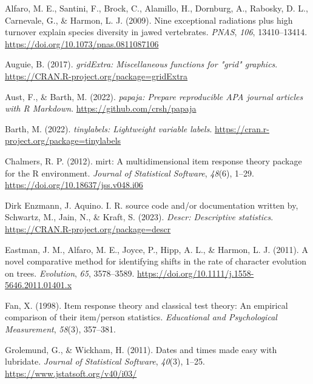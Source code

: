 \documentclass[
  jou]{apa6}
\newlength{\cslhangindent}
\newlength{\cslentryspacingunit} %
\newenvironment{CSLReferences}[2] %
 {%
  \setlength{\parindent}{0pt}
  \ifodd #1
  \let\oldpar\par
  \def\par{\hangindent=\cslhangindent\oldpar}
  \fi
  \setlength{\parskip}{#2\cslentryspacingunit}
 }%
 {}
\begin{document}
\hypertarget{refs}{}
\begin{CSLReferences}{1}{0}
\leavevmode{}%
Alfaro, M. E., Santini, F., Brock, C., Alamillo, H., Dornburg, A., Rabosky, D. L., Carnevale, G., \& Harmon, L. J. (2009). Nine exceptional radiations plus high turnover explain species diversity in jawed vertebrates. \emph{PNAS}, \emph{106}, 13410--13414. \url{https://doi.org/10.1073/pnas.0811087106}

\leavevmode{}%
Auguie, B. (2017). \emph{gridExtra: Miscellaneous functions for "grid" graphics}. \url{https://CRAN.R-project.org/package=gridExtra}

\leavevmode{}%
Aust, F., \& Barth, M. (2022). \emph{{papaja}: {Prepare} reproducible {APA} journal articles with {R Markdown}}. \url{https://github.com/crsh/papaja}

\leavevmode{}%
Barth, M. (2022). \emph{{tinylabels}: Lightweight variable labels}. \url{https://cran.r-project.org/package=tinylabels}

\leavevmode{}%
Chalmers, R. P. (2012). {mirt}: A multidimensional item response theory package for the {R} environment. \emph{Journal of Statistical Software}, \emph{48}(6), 1--29. \url{https://doi.org/10.18637/jss.v048.i06}

\leavevmode{}%
Dirk Enzmann, J. Aquino. I. R. source code and/or documentation written by, Schwartz, M., Jain, N., \& Kraft, S. (2023). \emph{Descr: Descriptive statistics}. \url{https://CRAN.R-project.org/package=descr}

\leavevmode{}%
Eastman, J. M., Alfaro, M. E., Joyce, P., Hipp, A. L., \& Harmon, L. J. (2011). A novel comparative method for identifying shifts in the rate of character evolution on trees. \emph{Evolution}, \emph{65}, 3578--3589. \url{https://doi.org/10.1111/j.1558-5646.2011.01401.x}

\leavevmode{}%
Fan, X. (1998). Item response theory and classical test theory: An empirical comparison of their item/person statistics. \emph{Educational and Psychological Measurement}, \emph{58}(3), 357--381.

\leavevmode{}%
Grolemund, G., \& Wickham, H. (2011). Dates and times made easy with {lubridate}. \emph{Journal of Statistical Software}, \emph{40}(3), 1--25. \url{https://www.jstatsoft.org/v40/i03/}


\end{CSLReferences}
\end{document}
